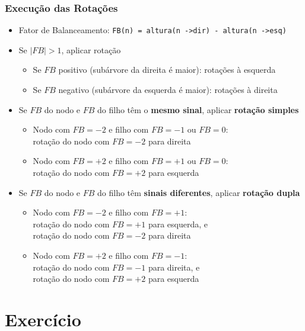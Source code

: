 \documentclass[aspectratio=169]{beamer}
\begin{document}
\begin{frame}\frametitle{Execução das Rotações}
\begin{itemize}
	\small
	\item	Fator de Balanceamento: \texttt{FB(n) = altura(n -\textgreater dir) - altura(n -\textgreater esq)}
	\item Se $|FB| > 1$, aplicar rotação
	\begin{itemize}
		\footnotesize
		\item Se $FB$ positivo (subárvore da direita é maior): rotações à esquerda
		\item Se $FB$ negativo (subárvore da esquerda é maior): rotações à direita
	\end{itemize}
	\item Se $FB$ do nodo e $FB$ do filho têm o \textbf{mesmo sinal}, aplicar \textbf{rotação simples}
	\begin{itemize}
		\footnotesize
		\item	Nodo com $FB = -2$ e filho com $FB = -1$ ou $FB = 0$:\\
			rotação do nodo com $FB = -2$ para direita
		\item	Nodo com $FB = +2$ e filho com $FB = +1$ ou $FB = 0$:\\
			rotação do nodo com $FB = +2$ para esquerda
	\end{itemize}
	\item Se $FB$ do nodo e $FB$ do filho têm \textbf{sinais diferentes}, aplicar \textbf{rotação dupla}
	\begin{itemize}
		\footnotesize
		\item	Nodo com $FB = -2$ e filho com $FB = +1$:\\
			rotação do nodo com $FB = +1$ para esquerda, e\\
			rotação do nodo com $FB = -2$ para direita
		\item	Nodo com $FB = +2$ e filho com $FB = -1$:\\
			rotação do nodo com $FB = -1$ para direita, e\\
			rotação do nodo com $FB = +2$ para esquerda
	\end{itemize}
\end{itemize}
\end{frame}

\section{Exercício}
\end{document}
